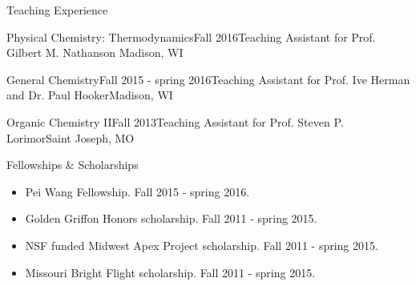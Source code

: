 \documentclass{resume} %
\begin{document}
\pagebreak


\begin{rSection}{Teaching Experience}
	
\begin{rSubsectionlistless}{Physical Chemistry: Thermodynamics}{Fall 2016}{Teaching Assistant for Prof. Gilbert M. Nathanson }{Madison, WI}
\end{rSubsectionlistless}

\begin{rSubsectionlistless}{General Chemistry}{Fall 2015 - spring 2016}{Teaching Assistant for Prof. Ive Herman and Dr. Paul Hooker}{Madison, WI}
\end{rSubsectionlistless}

\begin{rSubsectionlistless}{Organic Chemistry II}{Fall 2013}{Teaching Assistant for Prof. Steven P. Lorimor}{Saint Joseph, MO}
\end{rSubsectionlistless}

\end{rSection}


\begin{rSection}{Fellowships \& Scholarships}
	
\begin{itemize}[leftmargin = 0 pt]
	\item Pei Wang Fellowship. Fall 2015 - spring 2016.
	\item Golden Griffon Honors scholarship. Fall 2011 - spring 2015.
	\item NSF funded Midwest Apex Project scholarship. Fall 2011 - spring 2015.
	\item Missouri Bright Flight scholarship. Fall 2011 - spring 2015.
\end{itemize}
	
\end{rSection}
\end{document}
